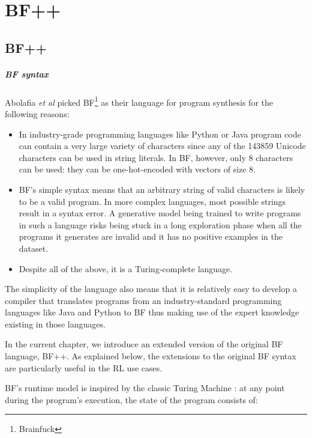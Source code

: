 \chapter{BF++}\label{ch:bfpp}


\section{BF++}
\label{sec:language}

\paragraph{BF syntax}
\label{sec:bf}

Abolafia {\sl et al} \cite{abolafiaNeuralProgramSynthesis2018} picked BF\footnote{Brainfuck} \cite{brainfuck} as their language for program synthesis for the following reasons:
\begin{itemize}
    \item In industry-grade programming languages like Python or Java program code can contain a very large variety of characters since any of the 143859 Unicode \cite{allenUnicodeStandard2012} characters can be used in string literals. In BF, however, only 8 characters can be used: they can be one-hot-encoded with vectors of size 8. 
    \item BF's simple syntax means that an arbitrary string of valid characters is likely to be a valid program. 
    In more complex languages, most possible strings result in a syntax error. 
    A generative model being trained to write programs in such a language risks being stuck in a long exploration phase when all the programs it generates are invalid and it has no positive examples in the dataset.
    \item Despite all of the above, it is a Turing-complete language.
\end{itemize}

The simplicity of the language also means that it is relatively easy to develop a compiler that translates programs from an industry-standard programming languages like Java and Python to BF thus making use of the expert knowledge existing in those languages. 

In the current chapter, we introduce an extended version of the original BF language, BF++. As explained below, the extensions to the original BF syntax are particularly useful in the RL use cases. 

BF's runtime model is inspired by the classic Turing Machine \cite{turing}: at any point during the program's execution, the state of the program consists of:

